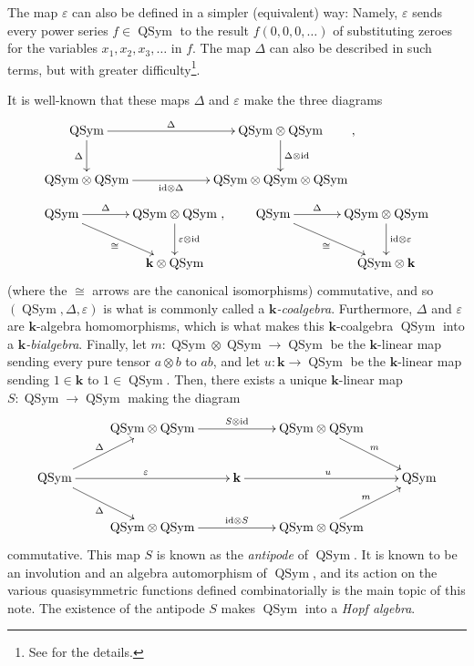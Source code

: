 \documentclass[numbers=enddot,12pt,final,onecolumn,notitlepage,abstracton]{scrartcl}%
\theoremstyle{definition}
\newcommand{\kk}{{\mathbf{k}}}
\newcommand{\id}{{\operatorname{id}}}
\newcommand{\QSym}{{\operatorname{QSym}}}
\newcommand{\bk}{{\mathbf{k}}}
\begin{document}
The map $\varepsilon$ can also be defined in a simpler
(equivalent) way: Namely, $\varepsilon$ sends every power series
$f \in \QSym$
to the result $f\left(0,0,0,\ldots\right)$ of substituting zeroes
for the variables $x_1, x_2, x_3, \ldots$ in $f$. The map $\Delta$
can also be described in such terms, but with greater
difficulty\footnote{See \cite[(5.3)]{Reiner} for the details.}.

It is well-known that these maps $\Delta$ and
$\varepsilon$ make the three diagrams
\begin{align*}
& \xymatrixcolsep{5pc}\xymatrix{
\QSym\ar[r]^-{\Delta} \ar[d]_{\Delta} & \QSym\otimes\QSym\ar[d]^{\Delta
\otimes\id} \\
\QSym\otimes\QSym\ar[r]_-{\id\otimes\Delta} & \QSym\otimes\QSym\otimes\QSym}
, \\
& \xymatrixcolsep{3pc}
\xymatrix{
\QSym\ar[dr]_{\cong} \ar[r]^-{\Delta} & \QSym\otimes\QSym\ar[d]^-{\varepsilon
\otimes\id} \\
& \bk\otimes\QSym}
,
\qquad
\xymatrixcolsep{3pc}
\xymatrix{
\QSym\ar[dr]_{\cong} \ar[r]^-{\Delta} & \QSym\otimes\QSym\ar[d]^-{\id
\otimes\varepsilon} \\
& \QSym\otimes\bk}
\end{align*}
(where the $\cong$ arrows are the canonical isomorphisms)
commutative, and so $\left(\QSym, \Delta, \varepsilon\right)$ is what
is commonly called a \textit{$\kk$-coalgebra}. Furthermore, $\Delta$
and $\varepsilon$ are $\kk$-algebra homomorphisms, which is what makes
this $\kk$-coalgebra $\QSym$ into a \textit{$\kk$-bialgebra}. Finally,
let $m : \QSym \otimes \QSym \to \QSym$ be the $\kk$-linear map sending
every pure tensor $a \otimes b$ to $ab$, and let $u : \kk \to \QSym$ be
the $\kk$-linear map sending $1 \in \kk$ to $1 \in \QSym$. Then, there
exists a unique $\kk$-linear map $S : \QSym \to \QSym$ making the
diagram
\begin{equation}
\xymatrix{
& \QSym \otimes \QSym \ar[rr]^{S \otimes \id} & & \QSym \otimes \QSym \ar[dr]^{m} & \\
\QSym \ar[ur]^{\Delta} \ar[rr]^{\varepsilon} \ar[dr]_{\Delta} & & \kk \ar[rr]^{u} & & \QSym \\
& \QSym \otimes \QSym \ar[rr]^{\id \otimes S} & & \QSym \otimes \QSym \ar[ur]^{m} & 
}
\label{eq.antipode}
\end{equation}
commutative. This map $S$ is known as the \textit{antipode} of $\QSym$.
It is known to be an involution and an algebra automorphism of $\QSym$,
and its action on the various quasisymmetric functions defined
combinatorially is the main topic of this note.
The existence of the antipode $S$ makes $\QSym$ into a
\textit{Hopf algebra}.
\end{document}
